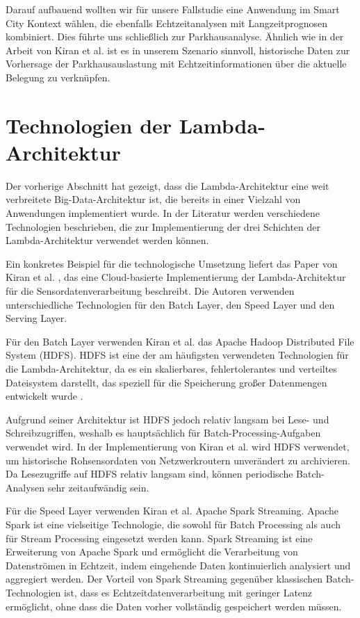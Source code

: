 Darauf aufbauend wollten wir für unsere Fallstudie eine Anwendung im Smart City Kontext wählen, die ebenfalls Echtzeitanalysen mit Langzeitprognosen kombiniert. Dies führte uns schließlich zur Parkhausanalyse. Ähnlich wie in der Arbeit von Kiran et al. \cite{kiran2015lambda} ist es in unserem Szenario sinnvoll, historische Daten zur Vorhersage der Parkhausauslastung mit Echtzeitinformationen über die aktuelle Belegung zu verknüpfen.

\section{Technologien der Lambda-Architektur}
Der vorherige Abschnitt hat gezeigt, dass die Lambda-Architektur eine weit verbreitete Big-Data-Architektur ist, die bereits in einer Vielzahl von Anwendungen implementiert wurde. In der Literatur werden verschiedene Technologien beschrieben, die zur Implementierung der drei Schichten der Lambda-Architektur verwendet werden können.

Ein konkretes Beispiel für die technologische Umsetzung liefert das Paper von Kiran et al. \cite{kiran2015lambda}, das eine Cloud-basierte Implementierung der Lambda-Architektur für die Sensordatenverarbeitung beschreibt. Die Autoren verwenden unterschiedliche Technologien für den Batch Layer, den Speed Layer und den Serving Layer.

Für den Batch Layer verwenden Kiran et al. \cite{kiran2015lambda} das Apache Hadoop Distributed File System (HDFS). HDFS ist eine der am häufigsten verwendeten Technologien für die Lambda-Architektur, da es ein skalierbares, fehlertolerantes und verteiltes Dateisystem darstellt, das speziell für die Speicherung großer Datenmengen entwickelt wurde \cite{ganelin2016spark}.

Aufgrund seiner Architektur ist HDFS jedoch relativ langsam bei Lese- und Schreibzugriffen, weshalb es hauptsächlich für Batch-Processing-Aufgaben verwendet wird. In der Implementierung von Kiran et al. wird HDFS verwendet, um historische Rohsensordaten von Netzwerkroutern unverändert zu archivieren. Da Lesezugriffe auf HDFS relativ langsam sind, können periodische Batch-Analysen sehr zeitaufwändig sein.

Für die Speed Layer verwenden Kiran et al. \cite{kiran2015lambda} Apache Spark Streaming. Apache Spark ist eine vielseitige Technologie, die sowohl für Batch Processing als auch für Stream Processing eingesetzt werden kann. Spark Streaming ist eine Erweiterung von Apache Spark und ermöglicht die Verarbeitung von Datenströmen in Echtzeit, indem eingehende Daten kontinuierlich analysiert und aggregiert werden.
Der Vorteil von Spark Streaming gegenüber klassischen Batch-Technologien ist, dass es Echtzeitdatenverarbeitung mit geringer Latenz ermöglicht, ohne dass die Daten vorher vollständig gespeichert werden müssen.


